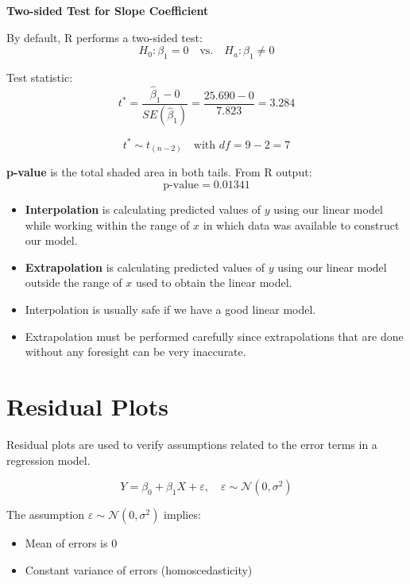 \begin{example}
\textbf{Two-sided Test for Slope Coefficient}

By default, R performs a two-sided test:
\[
H_0: \beta_1 = 0 \quad \text{vs.} \quad H_a: \beta_1 \neq 0
\]

\vspace{0.3cm}

Test statistic:
\[
t^* = \frac{\hat{\beta}_1 - 0}{SE(\hat{\beta}_1)} = \frac{25.690 - 0}{7.823} = 3.284
\]

\[
t^* \sim t_{(n - 2)}  \quad \text{with } df = 9 - 2 = 7
\]

\vspace{0.5cm}

\textbf{p-value} is the total shaded area in both tails. From R output:
\[
\text{p-value} = 0.01341
\]

\end{example}
\begin{definition}
\vspace{-1em}
\begin{itemize}
    \item{\textbf{Interpolation}} is calculating predicted values of $y$ using our linear model while working within the range of $x$ in which data was available to construct our model.
    
    \item{\textbf{Extrapolation}} is calculating predicted values of $y$ using our linear model outside the range of $x$ used to obtain the linear model.
    
    \item Interpolation is usually safe if we have a good linear model.
    
    \item Extrapolation must be performed carefully since extrapolations that are done without any foresight can be very inaccurate.
\end{itemize}
\end{definition}
\section{Residual Plots}

Residual plots are used to verify assumptions related to the error terms in a regression model.

\[
Y = \beta_0 + \beta_1 X + \varepsilon, \quad \varepsilon \sim \mathcal{N}(0, \sigma^2)
\]

The assumption $\varepsilon \sim \mathcal{N}(0, \sigma^2)$ implies:
\begin{itemize}
    \item Mean of errors is 0
    \item Constant variance of errors (homoscedasticity)
\end{itemize}

